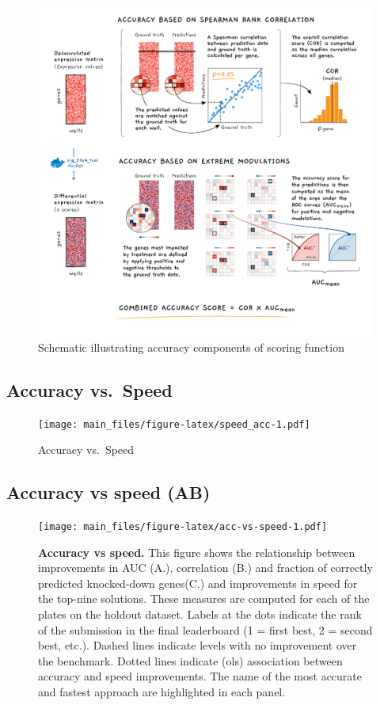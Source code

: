 \documentclass[]{article}
\begin{document}
\begin{figure}
\centering
\includegraphics{figures/deconvolution_contest Fig2_Final_revised.png}
\caption{Schematic illustrating accuracy components of scoring function}
\end{figure}

\hypertarget{accuracy-vs.-speed-1}{%
\subsection{Accuracy vs.~Speed}\label{accuracy-vs.-speed-1}}

\begin{figure}
\centering
\texttt{[image: main\_files/figure-latex/speed\_acc-1.pdf]}
\caption{\label{speed_acc}Accuracy vs.~Speed}
\end{figure}

\hypertarget{accuracy-vs-speed-ab}{%
\subsection{Accuracy vs speed (AB)}\label{accuracy-vs-speed-ab}}

\begin{figure}
\centering
\texttt{[image: main\_files/figure-latex/acc-vs-speed-1.pdf]}
\caption{\label{fig:acc-vs-speed}\textbf{Accuracy vs speed.} This figure
shows the relationship between improvements in AUC (A.), correlation
(B.) and fraction of correctly predicted knocked-down genes(C.) and
improvements in speed for the top-nine solutions. These measures are
computed for each of the plates on the holdout dataset. Labels at the
dots indicate the rank of the submission in the final leaderboard (1 =
first best, 2 = second best, etc.). Dashed lines indicate levels with no
improvement over the benchmark. Dotted lines indicate (ols) association
between accuracy and speed improvements. The name of the most accurate
and fastest approach are highlighted in each panel.}
\end{figure}
\end{document}
